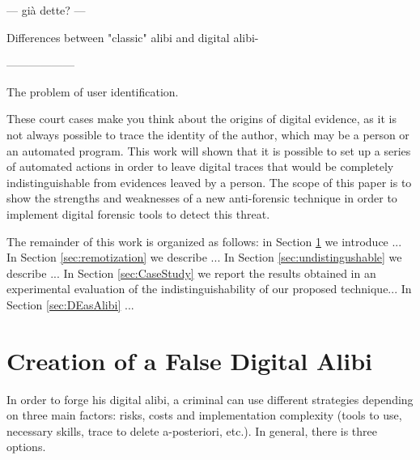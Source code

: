 \documentclass[runningheads,english]{llncs}
\begin{document}
--- già dette? ---

Differences between "classic" alibi and digital alibi-

------------------

The problem of user identification.

These court cases make you think about the origins of digital evidence, as it is
not always possible to trace the identity of the author, which may be a person
or an automated program. This work will shown that it is possible to set up a
series of automated actions in order to leave digital traces that would be
completely indistinguishable from evidences leaved by a person. The scope of
this paper is to show the strengths and weaknesses of a new anti-forensic
technique in order to implement digital forensic tools to detect this threat.

The remainder of this work is organized as follows: 
in Section \ref{sec:creation} we introduce ...
In Section \ref{sec:remotization} we describe ...
In Section \ref{sec:undistingushable} we describe ...
In Section \ref{sec:CaseStudy} we report the results obtained in an experimental
evaluation of the indistinguishability of our proposed technique...
In Section \ref{sec:DEasAlibi} ...

\section{Creation of a False Digital Alibi}
\label{sec:creation}
In order to forge his digital alibi, a criminal can use different strategies
depending on three main factors: risks, costs and implementation complexity
(tools to use, necessary skills, trace to delete a-posteriori, etc.). In
general, there is three options.
\end{document}
